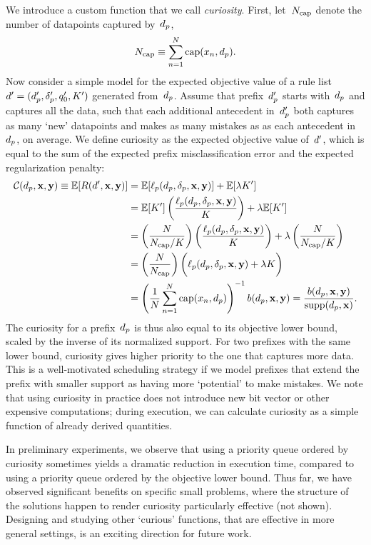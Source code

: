We introduce a custom function that we call \emph{curiosity}.
%
First, let~$N_{\textnormal{cap}}$ denote the number of datapoints captured by~$d_p$, \ie
\begin{align}
N_{\textnormal{cap}} \equiv \sum_{n=1}^N \textnormal{cap}(x_n, d_p).
\label{eq:num-cap}
\end{align}
%
Now consider a simple model for the expected objective value of a rule list
${{d}' = (d_p', \delta_p', q_0', K')}$ generated from~$d_p$.
%
Assume that prefix~$d_p'$ starts with~$d_p$ and captures all the data,
such that each additional antecedent in~$d_p'$
both captures as many `new' datapoints and makes as many mistakes as
as each antecedent in~$d_p$, on average.
%
We define curiosity as the expected objective value of~${d}'$,
which is equal to the sum of the expected prefix
misclassification error and the expected regularization penalty:
\begin{align}
\mathcal{C}(d_p, \mathbf{x}, \mathbf{y}) \equiv \mathbb{E}[ R({d}', \mathbf{x}, \mathbf{y}) ] &= \mathbb{E}[\ell_p(d_p, \delta_p, \mathbf{x}, \mathbf{y})] + \mathbb{E}[ {\lambda} K' ] \nonumber \\
&= \mathbb{E}[ K' ] \left(\frac{\ell_p(d_p, \delta_p, \mathbf{x}, \mathbf{y})}{K}\right) + {\lambda} \mathbb{E}[ K' ] \nonumber \\
&=  \left(\frac{N}{N_{\textnormal{cap}} / K}\right)
  \left(\frac{\ell_p(d_p, \delta_p, \mathbf{x}, \mathbf{y})}{K}\right)
  + {\lambda} \left(\frac{N}{N_{\textnormal{cap}} / K}\right) \nonumber \\
&= \left( \frac{N}{N_{\textnormal{cap}}} \right) \biggl(\ell_p(d_p, \delta_p, \mathbf{x}, \mathbf{y}) + {\lambda} K \biggr) \nonumber \\
&= \left( \frac{1}{N} \sum_{n=1}^N \textnormal{cap}(x_n, d_p) \right)^{-1} b(d_p, \mathbf{x}, \mathbf{y})
= \frac{b(d_p, \mathbf{x}, \mathbf{y})}{\textnormal{supp}(d_p, \mathbf{x})}. \nonumber
\end{align}
%
The curiosity for a prefix~$d_p$ is thus also equal to its objective lower bound,
scaled by the inverse of its normalized support.
%
For two prefixes with the same lower bound, curiosity gives higher priority to
the one that captures more data.
%
This is a well-motivated scheduling strategy if we model prefixes that extend
the prefix with smaller support as having more `potential' to make mistakes.
%
We note that using curiosity in practice does not introduce new bit vector
or other expensive computations; during execution, we can calculate curiosity
as a simple function of already derived quantities.

In preliminary experiments, we observe that using a priority queue ordered by
curiosity sometimes yields a dramatic reduction in execution time,
compared to using a priority queue ordered by the objective lower bound.
%
Thus far, we have observed significant benefits on specific small problems,
where the structure of the solutions happen to render curiosity particularly
effective (not shown).
%
Designing and studying other `curious' functions, that are effective in more
general settings, is an exciting direction for future work.

